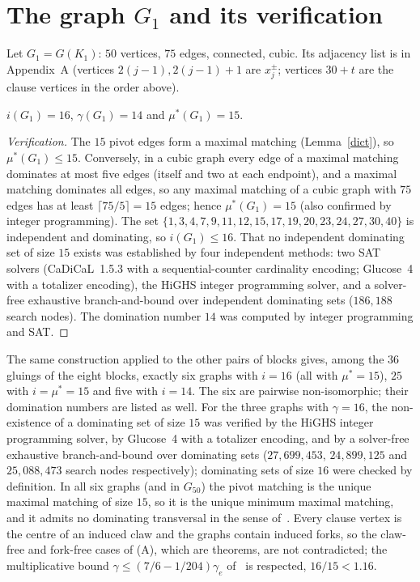 \documentclass[11pt]{article}
\theoremstyle{remark}\newtheorem{remark}[theorem]{Remark}
\begin{document}
\section{The graph $G_1$ and its verification}
Let $G_1=G(K_1)$: $50$ vertices, $75$ edges, connected, cubic. Its adjacency list is in Appendix~A (vertices $2(j-1),2(j-1)+1$ are $x_j^{\pm}$; vertices $30+t$ are the clause vertices in the order above).
\begin{proposition}
$i(G_1)=16$, $\gamma(G_1)=14$ and $\mu^*(G_1)=15$.
\end{proposition}
\begin{proof}[Verification]
The $15$ pivot edges form a maximal matching (Lemma~\ref{dict}), so $\mu^*(G_1)\le15$. Conversely, in a cubic graph every edge of a maximal matching dominates at most five edges (itself and two at each endpoint), and a maximal matching dominates all edges, so any maximal matching of a cubic graph with $75$ edges has at least $\lceil75/5\rceil=15$ edges; hence $\mu^*(G_1)=15$ (also confirmed by integer programming). The set $\{1,3,4,7,9,11,12,15,17,19,20,23,24,27,30,40\}$ is independent and dominating, so $i(G_1)\le16$. That no independent dominating set of size $15$ exists was established by four independent methods: two SAT solvers (CaDiCaL~1.5.3 with a sequential-counter cardinality encoding; Glucose~4 with a totalizer encoding), the HiGHS integer programming solver, and a solver-free exhaustive branch-and-bound over independent dominating sets ($186{,}188$ search nodes). The domination number $14$ was computed by integer programming and SAT.
\end{proof}
The same construction applied to the other pairs of blocks gives, among the $36$ gluings of the eight blocks, exactly six graphs with $i=16$ (all with $\mu^*=15$), $25$ with $i=\mu^*=15$ and five with $i=14$. The six are pairwise non-isomorphic; their domination numbers are listed as well. For the three graphs with $\gamma=16$, the non-existence of a dominating set of size $15$ was verified by the HiGHS integer programming solver, by Glucose~4 with a totalizer encoding, and by a solver-free exhaustive branch-and-bound over dominating sets ($27{,}699{,}453$, $24{,}899{,}125$ and $25{,}088{,}473$ search nodes respectively); dominating sets of size $16$ were checked by definition. In all six graphs (and in $G_{50}$) the pivot matching is the unique maximal matching of size $15$, so it is the unique minimum maximal matching, and it admits no dominating transversal in the sense of~\cite{Gupta}. Every clause vertex is the centre of an induced claw and the graphs contain induced forks, so the claw-free and fork-free cases of (A), which are theorems, are not contradicted; the multiplicative bound $\gamma\le(7/6-1/204)\gamma_e$ of~\cite{BFHMR} is respected, $16/15<1.16$.
\end{document}
